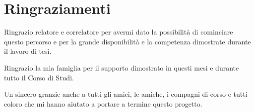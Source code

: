 \chapter*{Ringraziamenti}


Ringrazio relatore e correlatore per avermi dato la possibilità di cominciare questo percorso e per la grande disponibilità e la competenza dimostrate durante il lavoro di tesi.

Ringrazio la mia famiglia per il supporto dimostrato in questi mesi e durante tutto il Corso di Studi.

Un sincero granzie anche a tutti gli amici, le amiche, i compagni di corso e tutti coloro che mi hanno aiutato a portare a termine questo progetto.
